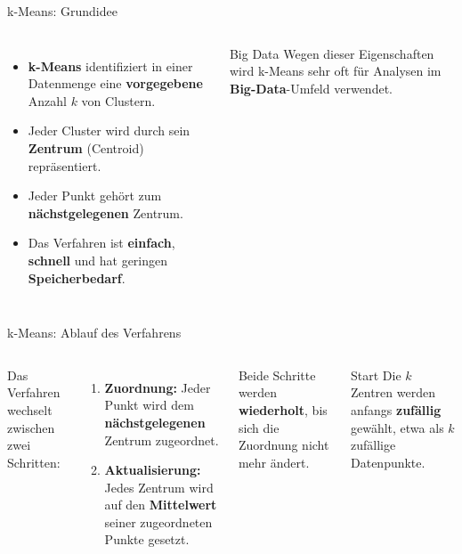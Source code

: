 \begin{frame}{k-Means: Grundidee}
\begin{columns}
\begin{itemize}
  \item \textbf{k-Means} identifiziert in einer Datenmenge eine
        \textbf{vorgegebene} Anzahl $k$ von Clustern.
  \item Jeder Cluster wird durch sein \textbf{Zentrum} (Centroid)
        repräsentiert.
  \item Jeder Punkt gehört zum \textbf{nächstgelegenen} Zentrum.
  \item Das Verfahren ist \textbf{einfach}, \textbf{schnell} und hat geringen
        \textbf{Speicherbedarf}.
\end{itemize}

\begin{block}{Big Data}
Wegen dieser Eigenschaften wird k-Means sehr oft für Analysen im
\textbf{Big-Data}-Umfeld verwendet.
\end{block}
\end{columns}
\end{frame}

\begin{frame}{k-Means: Ablauf des Verfahrens}
\begin{columns}
Das Verfahren wechselt zwischen zwei Schritten:
\begin{enumerate}[1.]
  \item \textbf{Zuordnung:} Jeder Punkt wird dem \textbf{nächstgelegenen}
        Zentrum zugeordnet.
  \item \textbf{Aktualisierung:} Jedes Zentrum wird auf den
        \textbf{Mittelwert} seiner zugeordneten Punkte gesetzt.
\end{enumerate}

\vspace{0.4em}
Beide Schritte werden \textbf{wiederholt}, bis sich die Zuordnung nicht mehr
ändert.

\begin{blockC1}{Start}
Die $k$ Zentren werden anfangs \textbf{zufällig} gewählt, etwa als $k$
zufällige Datenpunkte.
\end{blockC1}
\end{columns}
\end{frame}

